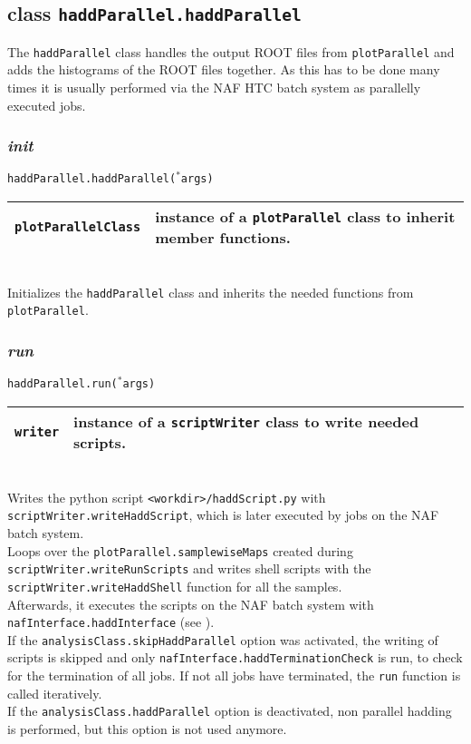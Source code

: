 \documentclass[12pt, a4paper]{article}
\newcommand{\args}{$^*$args}
\begin{document}
\subsection{class \texttt{haddParallel.haddParallel}}
\label{haddParallel}
The \texttt{haddParallel} class handles the output ROOT files from \texttt{plotParallel} and adds the histograms of the ROOT files together. As this has to be done many times it is usually performed via the NAF HTC batch system as parallelly executed jobs.

\subsubsection{\textit{init}}
\texttt{haddParallel.haddParallel(\args)}\\
\begin{tabular}{r|l}
\hline
\texttt{plotParallelClass}	& instance of a \texttt{plotParallel} class to inherit member functions.\\
\hline
\end{tabular}
\\
Initializes the \texttt{haddParallel} class and inherits the needed functions from \texttt{plotParallel}.

\subsubsection{\textit{run}}
\texttt{haddParallel.run(\args)}\\
\begin{tabular}{r|l}
\hline
\texttt{writer}	& instance of a \texttt{scriptWriter} class to write needed scripts.\\
\hline
\end{tabular}
\\
Writes the python script \texttt{<workdir>/haddScript.py} with \texttt{scriptWriter.writeHaddScript}, which is later executed by jobs on the NAF batch system.\\
Loops over the \texttt{plotParallel.samplewiseMaps} created during \texttt{scriptWriter.writeRunScripts} and writes shell scripts with the \texttt{scriptWriter.writeHaddShell} function for all the samples.\\
Afterwards, it executes the scripts on the NAF batch system with \texttt{nafInterface.haddInterface} (see \label{nafInterface}).\\
If the \texttt{analysisClass.skipHaddParallel} option was activated, the writing of scripts is skipped and only \texttt{nafInterface.haddTerminationCheck} is run, to check for the termination of all jobs. If not all jobs have terminated, the \texttt{run} function is called iteratively.\\
If the \texttt{analysisClass.haddParallel} option is deactivated, non parallel hadding is performed, but this option is not used anymore. 
\end{document}

